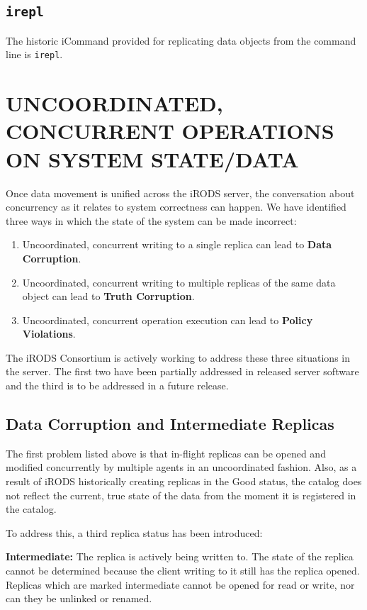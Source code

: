 \documentclass{irodsugm}
\begin{document}
\subsection*{\texttt{irepl}}
The historic iCommand provided for replicating data objects from the command line is \texttt{irepl}. 

\section*{UNCOORDINATED, CONCURRENT OPERATIONS ON SYSTEM STATE/DATA}

Once data movement is unified across the iRODS server, the conversation about concurrency as it relates to system correctness can happen. We have identified three ways in which the state of the system can be made incorrect:

\begin{enumerate}
\item Uncoordinated, concurrent writing to a single replica can lead to \textbf{Data Corruption}.
\item Uncoordinated, concurrent writing to multiple replicas of the same data object can lead to \textbf{Truth Corruption}.
\item Uncoordinated, concurrent operation execution can lead to \textbf{Policy Violations}.
\end{enumerate}

The iRODS Consortium is actively working to address these three situations in the server. The first two have been partially addressed in released server software and the third is to be addressed in a future release.

\subsection*{Data Corruption and Intermediate Replicas}

The first problem listed above is that in-flight replicas can be opened and modified concurrently by multiple agents in an uncoordinated fashion. Also, as a result of iRODS historically creating replicas in the Good status, the catalog does not reflect the current, true state of the data from the moment it is registered in the catalog.

To address this, a third replica status has been introduced:

\textbf{Intermediate:} The replica is actively being written to. The state of the replica cannot be determined because the client writing to it still has the replica opened. Replicas which are marked intermediate cannot be opened for read or write, nor can they be unlinked or renamed.
\end{document}

